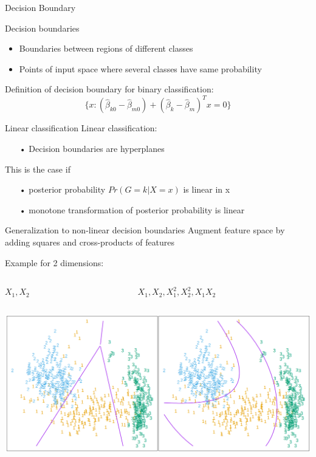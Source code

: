 \documentclass{beamer}
\begin{document}
\begin{frame}{Decision Boundary}

\vspace{0.2cm}
Decision boundaries 
\begin{itemize}
\item Boundaries between regions of different classes
\item Points of input space where several classes have same probability
\end{itemize}
\vspace{0.2cm}
Definition of decision boundary for binary classification:
\begin{equation*}
\{ x:(\hat{\beta}_{k0} - \hat{\beta}_{m0}) + 
(\hat{\beta}_{k} - \hat{\beta}_{m})^Tx = 0\}
\end{equation*}
\end{frame}


\begin{frame}{Linear classification}
Linear classification:
\begin{itemize}
\item[•] Decision boundaries are hyperplanes
\end{itemize}
This is the case if 
\begin{itemize}
\item[•] posterior probability $Pr(G=k|X=x)$ is linear in x
\item[•] monotone transformation of posterior probability is linear
\end{itemize}
\end{frame}


\begin{frame}{Generalization to non-linear decision boundaries}
Augment feature space by adding squares and cross-products of features

\vspace{0.2cm}
Example for 2 dimensions:
\begin{columns}
\begin{column}{0.5\textwidth}
\begin{center}
$X_1,X_2$
\end{center}
\end{column}
\begin{column}{0.5\textwidth}
\begin{center}
$X_1,X_2,X_1^2, X_2^2, X_1 X_2$
\end{center}
\end{column}
\end{columns}

\includegraphics[width=\textwidth]{AugmentedFeatures.png}
\end{frame}
\end{document}
